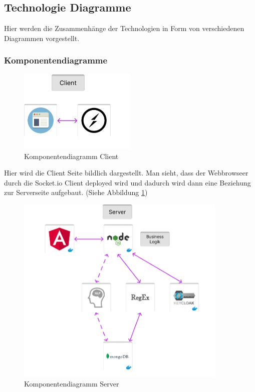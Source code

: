\newpage
\subsection{Technologie Diagramme}
 Hier werden die Zusammenhänge der Technologien in Form von verschiedenen Diagrammen vorgestellt.

\subsubsection{Komponentendiagramme}

\begin{figure}[H]
\centering
\includegraphics[width=0.5\textwidth]{bilder/technologien/KomponentendiagramClient.png}
\caption{Komponentendiagramm Client}
\label{fig:Komponentendiagramm_Client}
\end{figure}
Hier wird die Client Seite bildlich dargestellt. Man sieht, dass der Webbrowseer durch die 
Socket.io Client deployed wird und dadurch wird dann eine Beziehung zur Serverseite aufgebaut. (Siehe Abbildung \ref{fig:Komponentendiagramm_Client})

\begin{figure}[H]
\centering
\includegraphics[width=0.9\textwidth]{bilder/technologien/KomponentendiagramServer.png}
\caption{Komponentendiagramm Server}
\label{fig:Komponentendiagramm_Server}
\end{figure}

